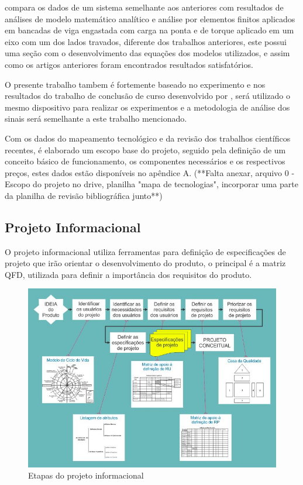 \autocite{Silva2017} \autocite{Silva2018} compara os dados de um sistema semelhante aos anteriores com resultados de análises de modelo matemático analítico e análise por elementos finitos aplicados em bancadas de viga engastada com carga na ponta e de torque aplicado em um eixo com um dos lados travados, diferente dos trabalhos anteriores, este possui uma seção com o desenvolvimento das equações dos modelos utilizados, e assim como os artigos anteriores foram encontrados resultados satisfatórios.

O presente trabalho tambem é fortemente baseado no experimento e nos resultados do trabalho de conclusão de curso desenvolvido por \autocite{Minela2017}, será utilizado o mesmo dispositivo para realizar os experimentos e a metodologia de análise dos sinais será semelhante a este trabalho mencionado.

Com os dados do mapeamento tecnológico e da revisão dos trabalhos científicos recentes, é elaborado um escopo base do projeto, seguido pela definição de um conceito básico de funcionamento, os componentes necessários e os respectivos preços, estes dados estão disponíveis no apêndice A. (**Falta anexar, arquivo 0 - Escopo do projeto no drive, planilha "mapa de tecnologias", incorporar uma parte da planilha de revisão bibliográfica junto**)

\subsection{Projeto Informacional}

O projeto informacional utiliza ferramentas para definição de especificações de projeto que irão orientar o desenvolvimento do produto, o principal é a matriz QFD, utilizada para definir a importância dos requisitos do produto.

\begin{figure}[htb]
	\caption{\label{fig:Fig_401}Etapas do projeto informacional}
	\begin{center}
		\includegraphics[width=\textwidth]{images/img402.jpg}
	\end{center}
\end{figure}

